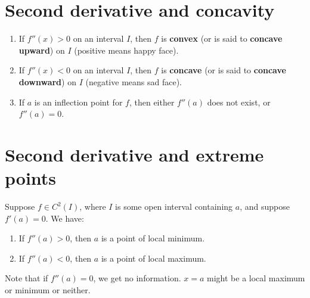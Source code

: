 \documentclass[11pt]{article}
\begin{document}
\section{Second derivative and concavity}
\label{sec:orgb2dde39}
\begin{enumerate}
\item If \(f''(x) > 0\) on an interval \(I\), then \(f\) is \textbf{convex} (or is said to \textbf{concave upward}) on \(I\) (positive means happy face).
\item If \(f''(x) < 0\) on an interval \(I\), then \(f\) is \textbf{concave} (or is said to \textbf{concave downward}) on \(I\) (negative means sad face).
\item If \(a\) is an inflection point for \(f\), then either \(f''(a)\) does not exist, or \(f''(a) = 0\).
\end{enumerate}
\section{Second derivative and extreme points}
\label{sec:orgc915aa9}
Suppose \(f \in C^2(I)\), where \(I\) is some open interval containing \(a\), and suppose \(f'(a) = 0\). We have:
\begin{enumerate}
\item If \(f''(a) > 0\), then \(a\) is a point of local minimum.
\item If \(f''(a) < 0\), then \(a\) is a point of local maximum.
\end{enumerate}

Note that if \(f''(a) = 0\), we get no information. \(x = a\) might be a local maximum or minimum or neither.
\end{document}
